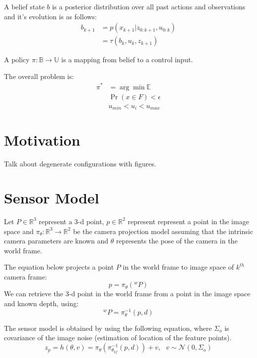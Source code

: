 \documentclass[conference]{IEEEtran}
\begin{document}
A belief state $b$ is a posterior distribution over all past actions and observations and it's evolution is as follows:
\begin{align}
    b_{k+1} &= p(x_{k+1}|z_{0:k+1}, u_{0:k}) \\
            &= \tau(b_k,u_k,z_{k+1})
\end{align} 

A policy $\pi : \mathbb{B} \to \mathbb{U}$ is a mapping from belief to a control input.

 The overall problem is:
\begin{align}
\pi^{*} &= \arg\min \mathbb{E}\\
\nonumber & \Pr(x\in F) < \epsilon \\
\nonumber & u_{min} < u_i < u_{max}
\end{align}

\section{Motivation}
Talk about degenerate configurations with figures.

\section{Sensor Model}

Let $P \in \mathbb{R}^{3}$ represent a 3-d point, $p \in \mathbb{R}^2$ represent represent a point in the image space and $\pi_\theta:\mathbb{R}^3\to\mathbb{R}^2$ be the camera projection model assuming that the intrinsic camera parameters are known and $\theta$ represents the pose of the camera in the world frame.

The equation below projects a point $P$ in the world frame to image space of $k^{th}$ camera frame:
\begin{equation} p=\pi_\theta(^{w}P) \end{equation}
We can retrieve the 3-d point in the world frame from a point in the image space and known depth, using: 
\begin{equation} ^{w}P=\pi^{-1}_\theta(p,d) \end{equation}

The sensor model is obtained by using the following equation, where $\Sigma_o$ is covariance of the image noise (estimation of location of the feature points).
\begin{equation}
     z_p = h(\theta,v)=
     \pi_\theta(\pi^{-1}_{\theta_{kf}}(p,d)) + v,~~~ v\sim \mathcal{N}(0,\Sigma_{o})
     \label{eq:ObsModel}
\end{equation}
\end{document}
